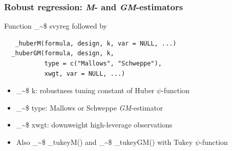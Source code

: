 \documentclass[framenumber,t]{beamer}
\makeatletter
\newcommand\code{\bgroup\@makeother\_\@makeother\~\@makeother\$\@makeother\^\@codex}
\def\@codex#1{{\normalfont\ttfamily\hyphenchar\font=-1 #1}\egroup}
\makeatother
\begin{document}
\begin{frame}[fragile]
    \frametitle{Robust regression: \emph{M}- and \emph{GM}-estimators}
     \alert{Function} \code{svyreg} followed by
    \begin{verbatim}
   _huberM(formula, design, k, var = NULL, ...)
  _huberGM(formula, design, k,
           type = c("Mallows", "Schweppe"),
           xwgt, var = NULL, ...)
    \end{verbatim}
    \vspace{-1.5em}
    \begin{itemize}
        \setlength\itemsep{0.5em}
        \item \code{k}: robustness tuning constant of Huber $\psi$-function
        \item \code{type}: Mallows or Schweppe \emph{GM}-estimator
        \item \code{xwgt}: downweight high-leverage observations
        \item \alert{Also} \code{_tukeyM()} and \code{_tukeyGM()} with Tukey
            $\psi$-function
    \end{itemize}
\end{frame}






\end{document}
